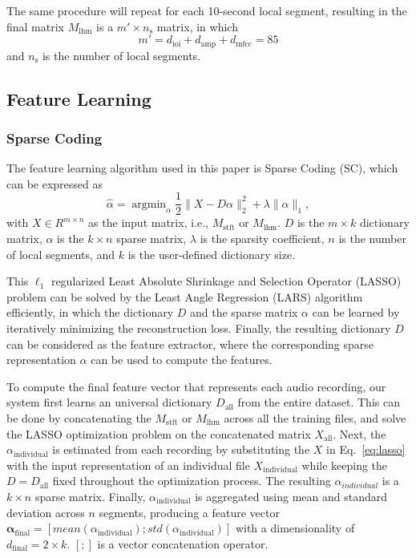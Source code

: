 \documentclass{ws-ijsc}
\begin{document}
The same procedure will repeat for each 10-second local segment, resulting in the final matrix $M_\mathrm{lhm}$ is a $m' \times n_\mathrm{s}$ matrix,  in which 
\begin{equation}
    m' = d_\mathrm{ioi} + d_\mathrm{amp} + d_\mathrm{mfcc} = 85
\end{equation}%
and $n_\mathrm{s}$ is the number of local segments.


\subsection{Feature Learning}\label{subsec:feat_learn}

\subsubsection{Sparse Coding}
\label{subsubsec:sc}
The feature learning algorithm used in this paper is Sparse Coding (SC), which can be expressed as %
\begin{equation}\label{eq:lasso}
\hat{\alpha} = \mathop{\mathrm{argmin}}_\alpha \frac{1}{2} \| X - D\alpha \|_{2}^{2} + \lambda \| \alpha \|_{1}, 
\end{equation}
%
with $X \in R^{ m \times n}$ as the input matrix, i.e., $M_\mathrm{stft}$ or $M_\mathrm{lhm}$. $D$ is the $m \times k$ dictionary matrix, $\alpha$ is the $k \times n$ sparse matrix, $\lambda$ is the sparsity coefficient, $n$ is the number of local segments, and $k$ is the user-defined dictionary size. 

This $\ell_1$ regularized Least Absolute Shrinkage and Selection Operator (LASSO) problem can be solved by the Least Angle Regression (LARS) algorithm efficiently\cite{Efron2004}, in which the dictionary $D$ and the sparse matrix $\alpha$ can be learned by iteratively minimizing the reconstruction loss. Finally, the resulting dictionary $D$ can be considered as the feature extractor, where the corresponding sparse representation $\alpha$ can be used to compute the features. 

To compute the final feature vector that represents each audio recording, our system first learns an universal dictionary $D_\mathrm{all}$ from the entire dataset. This can be done by concatenating the $M_\mathrm{stft}$ or $M_\mathrm{lhm}$ across all the training files, and solve the LASSO optimization problem on the concatenated matrix $X_\mathrm{all}$. %
Next, the $\alpha_\mathrm{individual}$ is estimated from each recording by substituting the $X$ in Eq.~\ref{eq:lasso} with the input representation of an individual file $X_\mathrm{individual}$ while keeping the $D = D_\mathrm{all}$ fixed throughout the optimization process. The resulting $\alpha_{individual}$ is a $k \times n$ sparse matrix. Finally, $\alpha_\mathrm{individual}$ is aggregated using mean and standard deviation across $n$ segments, producing a feature vector $\mathbf{\alpha_\mathrm{final}} = [mean(\alpha_\mathrm{individual}); std(\alpha_\mathrm{individual})]$ with a dimensionality of $d_\mathrm{final} = 2 \times k$. $[ ; ]$ is a vector concatenation operator.
\end{document}
